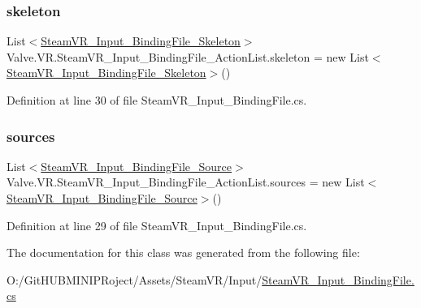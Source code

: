 \subsubsection{\texorpdfstring{skeleton}{skeleton}}
{\footnotesize\ttfamily List$<$\mbox{\hyperlink{class_valve_1_1_v_r_1_1_steam_v_r___input___binding_file___skeleton}{Steam\+V\+R\+\_\+\+Input\+\_\+\+Binding\+File\+\_\+\+Skeleton}}$>$ Valve.\+V\+R.\+Steam\+V\+R\+\_\+\+Input\+\_\+\+Binding\+File\+\_\+\+Action\+List.\+skeleton = new List$<$\mbox{\hyperlink{class_valve_1_1_v_r_1_1_steam_v_r___input___binding_file___skeleton}{Steam\+V\+R\+\_\+\+Input\+\_\+\+Binding\+File\+\_\+\+Skeleton}}$>$()}



Definition at line 30 of file Steam\+V\+R\+\_\+\+Input\+\_\+\+Binding\+File.\+cs.

\mbox{\label{class_valve_1_1_v_r_1_1_steam_v_r___input___binding_file___action_list_a0f87391e1af14c9db96cd029d356d88a}} 
\subsubsection{\texorpdfstring{sources}{sources}}
{\footnotesize\ttfamily List$<$\mbox{\hyperlink{class_valve_1_1_v_r_1_1_steam_v_r___input___binding_file___source}{Steam\+V\+R\+\_\+\+Input\+\_\+\+Binding\+File\+\_\+\+Source}}$>$ Valve.\+V\+R.\+Steam\+V\+R\+\_\+\+Input\+\_\+\+Binding\+File\+\_\+\+Action\+List.\+sources = new List$<$\mbox{\hyperlink{class_valve_1_1_v_r_1_1_steam_v_r___input___binding_file___source}{Steam\+V\+R\+\_\+\+Input\+\_\+\+Binding\+File\+\_\+\+Source}}$>$()}



Definition at line 29 of file Steam\+V\+R\+\_\+\+Input\+\_\+\+Binding\+File.\+cs.



The documentation for this class was generated from the following file\+:\begin{DoxyCompactItemize}
\item 
O\+:/\+Git\+H\+U\+B\+M\+I\+N\+I\+P\+Roject/\+Assets/\+Steam\+V\+R/\+Input/\mbox{\hyperlink{_steam_v_r___input___binding_file_8cs}{Steam\+V\+R\+\_\+\+Input\+\_\+\+Binding\+File.\+cs}}\end{DoxyCompactItemize}
